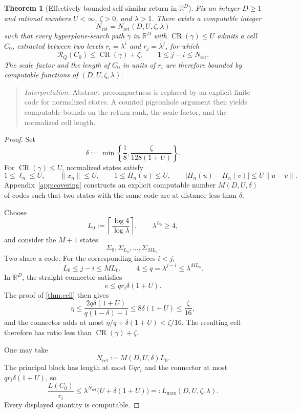 \documentclass[10pt,a4paper]{article}
\newtheorem{theorem}{Theorem}[section]
\theoremstyle{definition}
\theoremstyle{remark}
\DeclareMathOperator{\CR}{CR}
\newcommand{\R}{\mathbb{R}}
\newcommand{\norm}[1]{\lVert #1\rVert}
\newcommand{\abs}[1]{\lvert #1\rvert}
\newcommand{\cellratio}{\mathcal{R}}
\begin{document}
\begin{theorem}[Effectively bounded self-similar return in $\R^D$]
\label{thm:effective-return}
Fix an integer $D\ge1$ and rational numbers $U<\infty$, $\zeta>0$, and $\lambda>1$. There exists a computable integer
\[
N_{\mathrm{ret}}=N_{\mathrm{ret}}(D,U,\zeta,\lambda)
\]
such that every hyperplane-search path $\gamma$ in $\R^D$ with $\CR(\gamma)\le U$ admits a cell $C_0$, extracted between two levels $r_i=\lambda^i$ and $r_j=\lambda^j$, for which
\[
\cellratio_Q(C_0)\le \CR(\gamma)+\zeta,
\qquad
1\le j-i\le N_{\mathrm{ret}}.
\]
The scale factor and the length of $C_0$ in units of $r_i$ are therefore bounded by computable functions of $(D,U,\zeta,\lambda)$.
\end{theorem}

\begin{quote}\small
\textit{Interpretation.} Abstract precompactness is replaced by an explicit finite code for normalized states. A counted pigeonhole argument then yields computable bounds on the return rank, the scale factor, and the normalized cell length.
\end{quote}

\begin{proof}
Set
\begin{equation}
\delta:=\min\left\{\frac18,\frac{\zeta}{128(1+U)}\right\}.
\label{eq:effective-delta}
\end{equation}
For $\CR(\gamma)\le U$, normalized states satisfy
\begin{equation}
1\le \ell_n\le U,
\qquad
\norm{x_n}\le U,
\qquad
1\le H_n(u)\le U,
\qquad
\abs{H_n(u)-H_n(v)}\le U\norm{u-v}.
\label{eq:state-bounds}
\end{equation}
Appendix~\ref{app:covering} constructs an explicit computable number $M(D,U,\delta)$ of codes such that two states with the same code are at distance less than $\delta$.

Choose
\[
L_0:=\left\lceil\frac{\log4}{\log\lambda}\right\rceil,
\qquad
\lambda^{L_0}\ge4,
\]
and consider the $M+1$ states
\[
\Sigma_0,\Sigma_{L_0},\ldots,\Sigma_{ML_0}.
\]
Two share a code. For the corresponding indices $i<j$,
\[
L_0\le j-i\le ML_0,
\qquad
4\le q=\lambda^{j-i}\le\lambda^{ML_0}.
\]
In $\R^D$, the straight connector satisfies
\[
e\le qr_i\delta(1+U).
\]
The proof of \cref{thm:cell} then gives
\[
\eta\le
\frac{2q\delta(1+U)}{q(1-\delta)-1}
\le8\delta(1+U)
\le\frac{\zeta}{16},
\]
and the connector adds at most $\eta/q+\delta(1+U)<\zeta/16$. The resulting cell therefore has ratio less than $\CR(\gamma)+\zeta$.

One may take
\begin{equation}
N_{\mathrm{ret}}:=M(D,U,\delta)L_0.
\label{eq:Nret}
\end{equation}
The principal block has length at most $Uqr_i$ and the connector at most $qr_i\delta(1+U)$, so
\begin{equation}
\frac{L(C_0)}{r_i}
\le \lambda^{N_{\mathrm{ret}}}\bigl(U+\delta(1+U)\bigr)
=:L_{\max}(D,U,\zeta,\lambda).
\label{eq:Lmax}
\end{equation}
Every displayed quantity is computable.
\end{proof}
\end{document}
